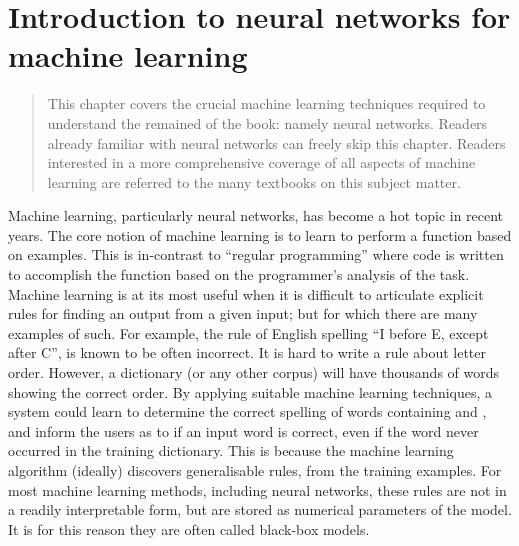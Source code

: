 \documentclass[12pt,parskip]{komatufte}
\begin{document}
	

\chapter{Introduction to neural networks for machine learning}\label{sec:machine-learning-for-representations}


\begin{abstract}
	This chapter covers the crucial machine learning techniques required to understand the remained of the book: namely neural networks.
	Readers already familiar with neural networks can freely skip this chapter.
	Readers interested in a more comprehensive coverage of all aspects of machine learning are referred to the many textbooks on this subject matter.
\end{abstract}

Machine learning, particularly neural networks, has become a hot topic in recent years.
The core notion of machine learning is to learn to perform a function based on examples.
This is in-contrast to ``regular programming'' where code is written to accomplish the function based on the programmer's analysis of the task.
Machine learning is at its most useful when it is difficult to articulate explicit rules for finding an output from a given input; but for which there are many examples of such.
For example, the rule of English spelling ``I before E, except after C'', is known to be often incorrect.
It is hard to write a rule about letter order.
However, a dictionary (or any other corpus) will have thousands of words showing the correct order.
By applying suitable machine learning techniques,
a system could learn to determine the correct spelling of words containing  and ,
and inform the users as to if an input word is correct, even if the word never occurred in the training dictionary.
This is because the machine learning algorithm (ideally) discovers generalisable rules, from the training examples.
For most machine learning methods, including neural networks, these rules are not in a readily interpretable form, but are stored as numerical parameters of the model.
It is for this reason they are often called black-box models.
\end{document}
